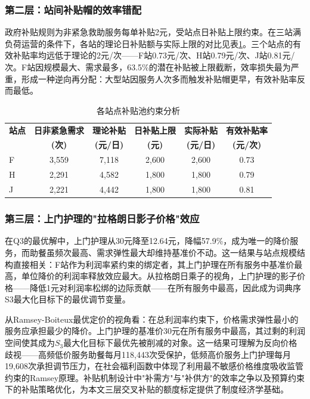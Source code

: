 \subsubsection{第二层：站间补贴帽的效率错配}

政府补贴规则为非紧急救助服务每单补贴2元，受站点日补贴上限约束。在三站满负荷运营的条件下，各站的理论日补贴额与实际上限的对比见表\ref{tab:q3_subsidy}。三个站点的有效补贴率均远低于理论的2元/次——F站0.73元/次、H站0.79元/次、J站0.81元/次。F站因规模最大、需求最多，63.5\%的潜在补贴被上限截断，效率损失最为严重，形成一种逆向再分配：大型站因服务人次多而触发补贴帽更早，有效补贴率反而最低。

\begin{table}[htbp]
\centering
\caption{各站点补贴池约束分析}
\label{tab:q3_subsidy}
\small
\begin{tabular}{lccccc}
\toprule
\textbf{站点} & \textbf{日非紧急需求} & \textbf{理论补贴} & \textbf{日补贴上限} & \textbf{实际补贴} & \textbf{有效补贴率} \\
 & \textbf{(次)} & \textbf{(元/日)} & \textbf{(元)} & \textbf{(元/日)} & \textbf{(元/次)} \\
\midrule
F & 3,559 & 7,118 & 2,600 & 2,600 & 0.73 \\
H & 2,291 & 4,582 & 1,800 & 1,800 & 0.79 \\
J & 2,221 & 4,442 & 1,800 & 1,800 & 0.81 \\
\bottomrule
\end{tabular}
\end{table}

\subsubsection{第三层：上门护理的"拉格朗日影子价格"效应}

在Q3的最优解中，上门护理从30元降至12.64元，降幅57.9\%，成为唯一的降价服务，而助餐虽频次最高、需求弹性最大却维持基准价不动。这一结果与站点规模结构直接相关：F站作为利润率紧约束的绑定者，其上门护理在所有服务中基准价最高，单位降价的利润率释放效应最大。从拉格朗日乘子的视角，上门护理的影子价格——降低1元对利润率松绑的边际贡献——在所有服务中最高，因此成为词典序S3最大化目标下的最优调节变量。

从Ramsey-Boiteux最优定价的视角看：在总利润率约束下，价格需求弹性最小的服务应承担最少的降价。上门护理的基准价30元在所有服务中最高，其过剩的利润空间使其成为$S_3$最大化目标下最优先被削减的对象。这一结果可理解为反向价格歧视——高频低价服务助餐每月118,443次受保护，低频高价服务上门护理每月19,608次承担调节压力，在社会福利函数中体现了利用最不敏感价格维度吸收监管约束的Ramsey原理\cite{ramsey1927}。补贴机制设计中"补需方"与"补供方"的效率之争\cite{feng2024}以及预算约束下的补贴策略优化\cite{zhao2024}，为本文三层交叉补贴的额度标定提供了制度经济学基础。

